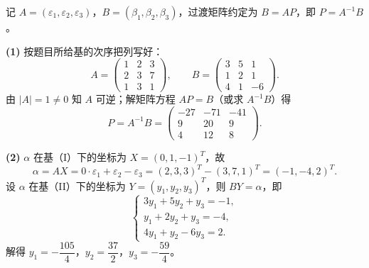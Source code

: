 \begin{solution}
记 $A=(\varepsilon_1,\varepsilon_2,\varepsilon_3)$，$B=(\beta_1,\beta_2,\beta_3)$，过渡矩阵约定为 $B=AP$，即 $P=A^{-1}B$。

\textbf{(1)} 按题目所给基的次序把列写好：
\[
A=\begin{pmatrix}1&2&3\\2&3&7\\1&3&1\end{pmatrix},\qquad
B=\begin{pmatrix}3&5&1\\1&2&1\\4&1&-6\end{pmatrix}.
\]
由 $|A|=1\ne0$ 知 $A$ 可逆；解矩阵方程 $AP=B$（或求 $A^{-1}B$）得
\[
P=A^{-1}B=\begin{pmatrix}-27&-71&-41\\9&20&9\\4&12&8\end{pmatrix}.
\]

\textbf{(2)} $\alpha$ 在基（I）下的坐标为 $X=(0,1,-1)^{T}$，故
\[
\alpha=AX=0\cdot\varepsilon_1+\varepsilon_2-\varepsilon_3=(2,3,3)^{T}-(3,7,1)^{T}=(-1,-4,2)^{T}.
\]
设 $\alpha$ 在基（II）下的坐标为 $Y=(y_1,y_2,y_3)^{T}$，则 $BY=\alpha$，即
\[
\begin{cases}
3y_1+5y_2+y_3=-1,\\
y_1+2y_2+y_3=-4,\\
4y_1+y_2-6y_3=2 .
\end{cases}
\]
解得 $y_1=-\dfrac{105}{4}$，$y_2=\dfrac{37}{2}$，$y_3=-\dfrac{59}{4}$。
\end{solution}

